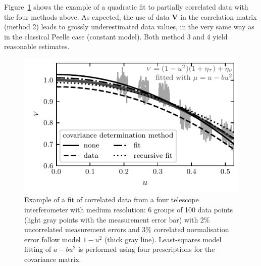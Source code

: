 \documentclass[twocolumn]{article}
\def\vec#1{\ensuremath{\boldsymbol{#1}}}
\def\data{\ensuremath{{\scriptstyle V}}}
\def\vdata{\ensuremath{\vec\data}}
\begin{document}
Figure~\ref{fig:fitexample} shows the example of a quadratic fit to partially correlated data with the four methods above.  As expected, the use of data $\vdata$ in the correlation matrix (method 2) leads to grossly underestimated data values, in the very same way as in the classical Peelle case (constant model).  Both method 3 and 4 yield reasonable estimates.

\begin{figure}[t]
\centering
\includegraphics[width=\linewidth]{pdf/fit-example.pdf}
\caption{Example of a fit of correlated data from a four telescope interferometer with medium resolution: 6 groups of 100 data points (light gray points with the measurement error bar) with 2\% uncorrelated measurement errors and 3\% correlated normalisation error follow model $1-u^2$ (thick gray line). Least-squares model fitting of $a-bu^2$ is performed using four prescriptions for the covariance matrix.}
\label{fig:fitexample}
\end{figure}
\end{document}

